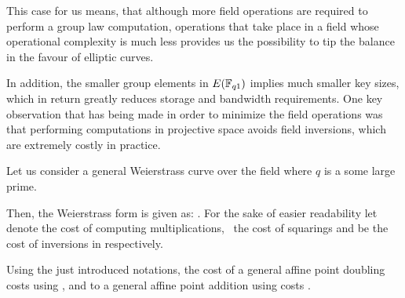 This case for us means, that although more field operations are required to perform a group law computation,  operations that take place in a field whose operational complexity is much less provides us the possibility to tip the balance in the favour of elliptic curves. 

In addition, the smaller group elements in $E(\mathbb{F}_{q1})$ implies much smaller key sizes, which in return greatly reduces storage and bandwidth requirements. One key observation that has being made in order to minimize the field operations was that performing computations in projective space avoids field inversions, which are extremely costly in practice.

\begin{example}
\label{example:costofgrouplaw}
Let us consider a general Weierstrass curve over the field  where $q$ is a some large prime. 

Then, the Weierstrass form is given as: \EquationShortWeierstrassEquationFree. For the sake of easier readability let \mathFormulaCostOfComputingMultiplication ~ denote the cost 
of computing multiplications, \mathFormulaCostOfComputingSquaring ~the cost of squarings and \mathFormulaCostOfComputingInversions be the cost of inversions in  respectively. 

Using the just introduced notations, the cost of a general affine point doubling  costs  
\mathFormulaObject{2 \mathFormulaCostOfComputingMultiplication 
	+ 2 \mathFormulaCostOfComputingSquaring 
	+ \mathFormulaCostOfComputingInversions} using , 
and to a general affine point addition using    costs  	
\mathFormulaObject{
	2 \mathFormulaCostOfComputingMultiplication
	+ \mathFormulaCostOfComputingSquaring
	+ \mathFormulaCostOfComputingInversions
}.
\end{example}


